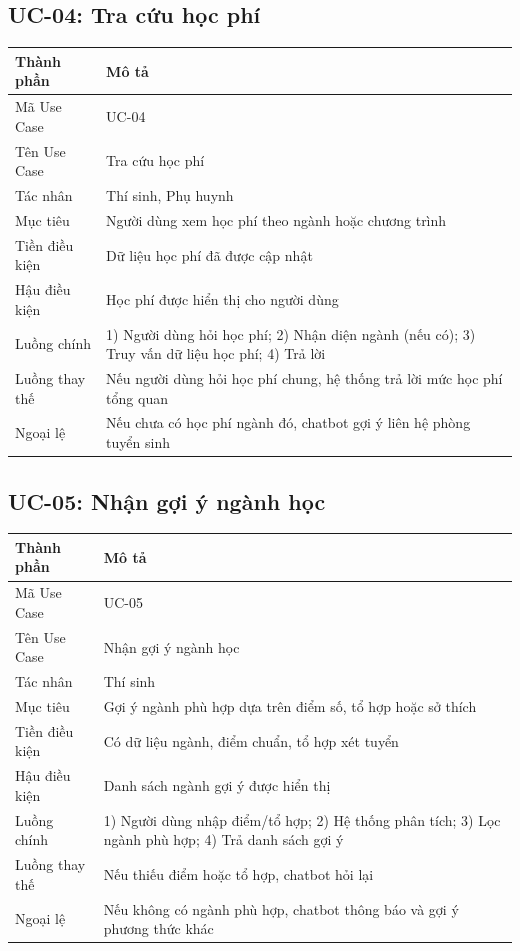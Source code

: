 \subsection{UC-04: Tra cứu học phí}
\begin{table}[H]
\centering
\begin{tabular}{|p{3.5cm}|p{8.5cm}|}
\hline
\textbf{Thành phần} & \textbf{Mô tả} \\ \hline
Mã Use Case & UC-04 \\ \hline
Tên Use Case & Tra cứu học phí \\ \hline
Tác nhân & Thí sinh, Phụ huynh \\ \hline
Mục tiêu & Người dùng xem học phí theo ngành hoặc chương trình \\ \hline
Tiền điều kiện & Dữ liệu học phí đã được cập nhật \\ \hline
Hậu điều kiện & Học phí được hiển thị cho người dùng \\ \hline
Luồng chính & 1) Người dùng hỏi học phí; 2) Nhận diện ngành (nếu có); 3) Truy vấn dữ liệu học phí; 4) Trả lời \\ \hline
Luồng thay thế & Nếu người dùng hỏi học phí chung, hệ thống trả lời mức học phí tổng quan \\ \hline
Ngoại lệ & Nếu chưa có học phí ngành đó, chatbot gợi ý liên hệ phòng tuyển sinh \\ \hline
\end{tabular}
\end{table}

\subsection{UC-05: Nhận gợi ý ngành học}
\begin{table}[H]
\centering
\begin{tabular}{|p{3.5cm}|p{8.5cm}|}
\hline
\textbf{Thành phần} & \textbf{Mô tả} \\ \hline
Mã Use Case & UC-05 \\ \hline
Tên Use Case & Nhận gợi ý ngành học \\ \hline
Tác nhân & Thí sinh \\ \hline
Mục tiêu & Gợi ý ngành phù hợp dựa trên điểm số, tổ hợp hoặc sở thích \\ \hline
Tiền điều kiện & Có dữ liệu ngành, điểm chuẩn, tổ hợp xét tuyển \\ \hline
Hậu điều kiện & Danh sách ngành gợi ý được hiển thị \\ \hline
Luồng chính & 1) Người dùng nhập điểm/tổ hợp; 2) Hệ thống phân tích; 3) Lọc ngành phù hợp; 4) Trả danh sách gợi ý \\ \hline
Luồng thay thế & Nếu thiếu điểm hoặc tổ hợp, chatbot hỏi lại \\ \hline
Ngoại lệ & Nếu không có ngành phù hợp, chatbot thông báo và gợi ý phương thức khác \\ \hline
\end{tabular}
\end{table}

